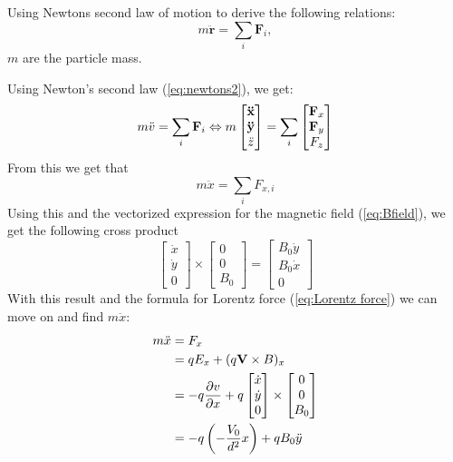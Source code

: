 \documentclass[english,notitlepage,reprint,nofootinbib]{revtex4-1}  %
\begin{document}
	Using Newtons second law of motion to derive the following relations:
	\begin{equation} \label{eq:newtons2}
		m\ddot{\mathbf{r}} = \sum_i \mathbf{F}_i,
	\end{equation}
	$m$ are the particle mass.
	
	Using Newton’s second law (\ref{eq:newtons2}), we get:
	\begin{equation*}
		m \ddot{v} = \sum_i \vectorbold{F}_i \Leftrightarrow m
		\begin{bmatrix}
			\vectorbold{\ddot{x}} \\
			\vectorbold{\ddot{y}} \\
			\ddot{z}
		\end{bmatrix}
		= \sum_i
		\begin{bmatrix}
			\vectorbold{F}_x \\
			\vectorbold{F}_y \\
			F_z
		\end{bmatrix}
	\end{equation*}
	From this we get that 
	\begin{equation*}
		m \ddot{x} = \sum_i F_{x,i}
	\end{equation*}
	Using this and the vectorized expression for the magnetic field (\ref{eq:Bfield}), we get the following cross product
	\begin{equation*}
		\begin{bmatrix}
			\dot{x} \\
			\dot{y} \\
			0
		\end{bmatrix}
		\times
		\begin{bmatrix}
			0\\
			0 \\
			B_0
		\end{bmatrix}
		=
		\begin{bmatrix}
			B_0 \dot{y} \\
			B_0 \dot{x} \\
			0
		\end{bmatrix}
	\end{equation*}
	With this result and the formula for Lorentz force (\ref{eq:Lorentz force}) we can move on and find $m \ddot{x}$:
	\begin{align*}
		m \ddot{x} &= F_x \\
		&= q E_x + (q \vectorbold{V} \times B)_x \\
		&= -q \frac{\partial v}{\partial x} + q
		\begin{bmatrix}
			\dot{x} \\
			\dot{y} \\
			0
		\end{bmatrix}
		\times
		\begin{bmatrix}
			0 \\
			0 \\
			B_0
		\end{bmatrix} \\
		&= - q \left( - \frac{V_0}{d^2} x \right) + q B_0 \ddot{y} \\
	\end{align*}
\end{document}
